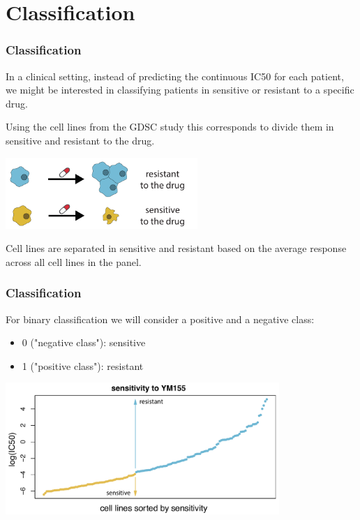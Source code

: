 \documentclass[notes]{beamer}          %
\begin{document}
\section{Classification}

\begin{frame}
\frametitle{Classification}
In a clinical setting, instead of predicting the continuous IC50 for each patient, we might be interested in classifying patients in sensitive or resistant to a specific drug.

\vspace{5mm} 

Using the cell lines from the GDSC study this corresponds to divide them in sensitive and resistant to the drug. 

\begin{center}
\includegraphics[height=2.7cm]{../figures/week_2_linear_models/GDSC_classification_overview.pdf}
\end{center}

Cell lines are separated in sensitive and resistant based on the average response across all cell lines in the panel.

\end{frame}

\begin{frame}
\frametitle{Classification}

For binary classification we will consider a positive and a negative class:

\begin{itemize}
    \item 0 ("negative class"): sensitive
    \item 1 ("positive class"): resistant
\end{itemize}

\begin{center}
\includegraphics[height=5cm]{../figures/week_2_linear_models/GDSC_classification_sensitivity.pdf}
\end{center}
\end{frame}
\end{document}
